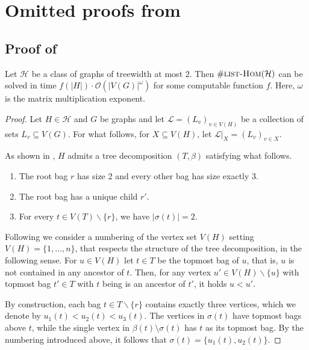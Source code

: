 \documentclass[authorcolumns,numberwithinsect]{no-lipics-v2022}
\newcommand{\listhomsprob}
{\text{\sc{list-Hom}}}
\begin{document}
\section{Omitted proofs from }\label{sec:appendix_fastMM}
\subsection{Proof of }\label{lem:AppendixListHomsMatrix}
\begin{lemma}
Let $\mathcal{H}$ be a class of graphs of treewidth at most 2.
Then $\#\listhomsprob(\mathcal{H})$ can be solved in time $f(|H|)\cdot \mathcal{O}(|V(G)|^{\omega})$ for some computable function $f$. Here, $\omega$ is the matrix multiplication exponent.
\end{lemma}
\begin{proof}
Let $H \in \mathcal{H}$ and $G$ be graphs and let $\mathcal{L} = (L_v)_{v\in V(H)}$ be a collection of sets $L_v \subseteq V(G)$. For what follows, for $X \subseteq V(H)$, let $\mathcal{L}|_{X} = (L_v)_{v \in X}$. 

As shown in \cite{CurticapeanDM17}, $H$ admits a tree decomposition $(T,\beta)$ satisfying what follows.
\begin{enumerate}
    \item The root bag $r$ has size 2 and every other bag has size exactly 3.
    \item The root bag has a unique child $r'$.
    \item For every $t \in V(T)\backslash\{r\}$, we have $|\sigma(t)| = 2$. 
\end{enumerate}

Following \cite{CurticapeanDM17} we consider a numbering of the vertex set $V(H)$ setting $V(H) = \{1,\ldots, n\}$, that respects the structure of the tree decomposition, in the following sense. For $u \in V(H)$ let $t \in T$ be the topmost bag of $u$, that is, $u$ is not contained in any ancestor of $t$. Then, for any vertex $u' \in V(H)\backslash\{u\}$ with topmost bag $t' \in T$ with $t$ being is an ancestor of $t'$, it holds $u < u'$.

By construction, each bag $t\in T\backslash\{r\}$ contains exactly three vertices, which we denote by $u_1(t) < u_2(t) < u_3(t)$. The vertices in $\sigma(t)$ have topmost bags above $t$, while the single vertex in $\beta(t)\setminus \sigma(t)$ has $t$ as its topmost bag. By the numbering introduced above, it follows that $\sigma(t) = \{u_1(t), u_2(t)\}$.


\end{proof}
\end{document}
